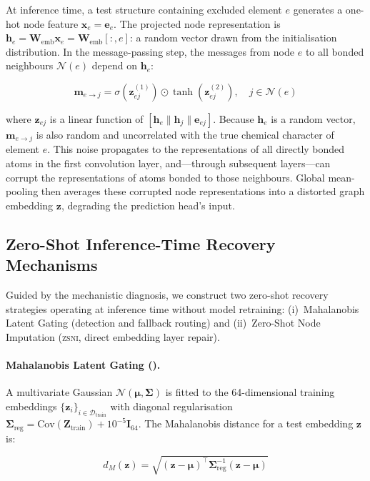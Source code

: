 \documentclass[final,5p,twocolumn,10pt]{elsarticle}
\newcommand{\zsni}{\textsc{zsni}}
\begin{document}
At inference time, a test structure containing excluded element $e$
generates a one-hot node feature $\bm{x}_e = \bm{e}_e$. The projected
node representation is $\bm{h}_e = \bm{W}_{\text{emb}} \bm{x}_e = \bm{W}_{\text{emb}}[:,e]$:
a random vector drawn from the initialisation distribution. In the
message-passing step, the messages from node $e$ to all bonded neighbours
$\mathcal{N}(e)$ depend on $\bm{h}_e$:

\begin{equation}
  \bm{m}_{e \to j} = \sigma\!\left(\bm{z}^{(1)}_{ej}\right) \odot \tanh\!\left(\bm{z}^{(2)}_{ej}\right), \quad j \in \mathcal{N}(e)
\end{equation}

\noindent where $\bm{z}_{ej}$ is a linear function of $[\bm{h}_e \| \bm{h}_j \| \bm{e}_{ej}]$.
Because $\bm{h}_e$ is a random vector, $\bm{m}_{e \to j}$ is also random
and uncorrelated with the true chemical character of element $e$.
This noise propagates to the representations of all directly bonded atoms
in the first convolution layer, and---through subsequent layers---can
corrupt the representations of atoms bonded to those neighbours.
Global mean-pooling then averages these corrupted node representations
into a distorted graph embedding $\bm{z}$, degrading the prediction head's
input.

\subsection{Zero-Shot Inference-Time Recovery Mechanisms}
\label{sec:recovery}

Guided by the mechanistic diagnosis, we construct two zero-shot recovery
strategies operating at inference time without model retraining:
(i)~Mahalanobis Latent Gating (detection and fallback routing) and
(ii)~Zero-Shot Node Imputation (\zsni{}, direct embedding layer repair).

\paragraph{Mahalanobis Latent Gating (\label{sec:gating}).}
A multivariate Gaussian $\mathcal{N}(\bm{\mu}, \bm{\Sigma})$ is fitted to
the 64-dimensional training embeddings $\{\bm{z}_i\}_{i \in \mathcal{D}_{\text{train}}}$
with diagonal regularisation
$\bm{\Sigma}_{\text{reg}} = \mathrm{Cov}(\bm{Z}_{\text{train}}) + 10^{-5}\bm{I}_{64}$.
The Mahalanobis distance for a test embedding $\bm{z}$ is:

\begin{equation}
  d_M(\bm{z}) = \sqrt{(\bm{z} - \bm{\mu})^\top \bm{\Sigma}_{\text{reg}}^{-1} (\bm{z} - \bm{\mu})}
\end{equation}
\end{document}
